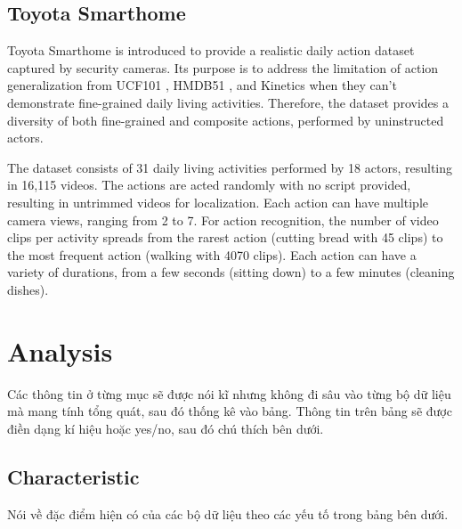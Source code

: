 \documentclass[a4paper]{article}
\begin{document}
\subsection{Toyota Smarthome}
Toyota Smarthome \cite{ToyotaSmarthome} is introduced to provide a realistic daily action dataset captured by security cameras. Its purpose is to address the limitation of action generalization from UCF101 \cite{UCF101}, HMDB51 \cite{HMDB51}, and Kinetics \cite{Kinetics-400} when they can't demonstrate fine-grained daily living activities. Therefore, the dataset provides a diversity of both fine-grained and composite actions, performed by uninstructed actors.

The dataset consists of 31 daily living activities performed by 18 actors, resulting in 16,115 videos. The actions are acted randomly with no script provided, resulting in untrimmed videos for localization. Each action can have multiple camera views, ranging from 2 to 7. For action recognition, the number of video clips per activity spreads from the rarest action (cutting bread with 45 clips) to the most frequent action (walking with 4070 clips). Each action can have a variety of durations, from a few seconds (sitting down) to a few minutes (cleaning dishes).
\section{Analysis}
Các thông tin ở từng mục sẽ được nói kĩ nhưng không đi sâu vào từng bộ dữ liệu mà mang tính tổng quát, sau đó thống kê vào bảng. Thông tin trên bảng sẽ được điền dạng kí hiệu hoặc yes/no, sau đó chú thích bên dưới.

\subsection{Characteristic}
Nói về đặc điểm hiện có của các bộ dữ liệu theo các yếu tố trong bảng bên dưới.

\newcommand{\cmark}{\ding{51}}%
\newcommand{\xmark}{\ding{55}}%
\end{document}
